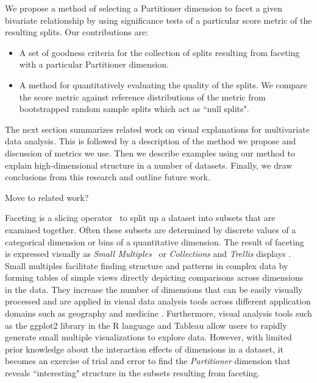 We propose a method of selecting a Partitioner dimension to facet a given bivariate relationship by using significance tests of a particular score metric of the resulting splits. Our contributions are:
\begin{itemize}
    \item A set of goodness criteria for the collection of splits resulting from faceting with a particular Partitioner dimension.
    \item A method for quantitatively evaluating the quality of the splits. We compare the score metric against  reference distributions of the metric from bootstrapped random sample splits which act as ``null splits".
\end{itemize}

The next section summarizes related work on visual explanations for multivariate data analysis. This is followed by a description of the method we propose and discussion of metrics we use. Then we describe examples using our method to explain high-dimensional structure in a number of datasets. Finally, we draw conclusions from this research and outline future work.


Move to related work?

Faceting is a slicing operator~\cite{Wilkinson2005GG, Munzner2014} to split up a dataset into subsets that are examined together. Often these subsets are determined by discrete values of a categorical dimension or bins of a quantitative dimension. The result of faceting is expressed visually as \textit{Small Multiples}~\cite{tufte1986} or \textit{Collections}\cite{Bertin1983} and \textit{Trellis} displays \cite{Becker1996}. Small multiples facilitate finding structure and patterns in complex data by forming tables of simple views directly depicting comparisons across dimensions in the data. They increase the number of dimensions that can be easily visually processed and are applied in visual data analysis tools across different application domains such as geography \cite{Guo2006, Maceachren2003} and medicine \cite{Lunzer2010, Sarni2005}. Furthermore, visual analysis tools such as the ggplot2 library in the R language \cite{Wickham2006} and Tableau \cite{Stolte2002} allow users to rapidly generate small multiple visualizations to explore data. However, with limited prior knowledge about the interaction effects of dimensions in a dataset, it becomes an exercise of trial and error to find the \textit{Partitioner} dimension that reveals ``interesting" structure in the subsets resulting from faceting.

